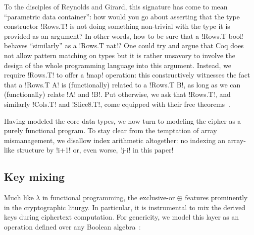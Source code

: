 \documentclass[draft,english]{jflart}
\begin{document}
To the disciples of Reynolds and Girard, this signature has come to
mean ``parametric data container'': how would you go about asserting
that the type constructor \coqe!Rows.T! is not doing something
non-trivial with the type it is provided as an argument? In other
words, how to be sure that a \coqe!Rows.T bool! behaves ``similarly''
as a \coqe!Rows.T nat!? One could try and argue that Coq does not
allow pattern matching on types but it is rather unsavory to involve
the design of the whole programming language into this argument.
%
Instead, we require \coqe!Rows.T! to offer a \coqe!map! operation: this
constructively witnesses the fact that a \coqe!Rows.T A! is
(functionally) related to a \coqe!Rows.T B!, as long as we can
(functionally) relate \coqe!A! and \coqe!B!. Put otherwise, we ask
that \coqe!Rows.T!, and similarly \coqe!Cols.T! and \coqe!Slice8.T!,
come equipped with their free theorems~\citep{reynolds:parametricity,
  wadler:free-theorem}.


Having modeled the core data types, we now turn to modeling the cipher
as a purely functional program. To stay clear from the temptation of
array mismanagement, we disallow index arithmetic altogether: no
indexing an array-like structure by \coqe!i+1! or, even worse,
\coqe!j-i! in this paper!

\subsection{Key mixing}


Much like $\lambda$ in functional programming, the exclusive-or
$\oplus$ features prominently in the cryptographic liturgy. In
particular, it is instrumental to mix the derived keys during
ciphertext computation. For genericity, we model this layer as an
operation defined over any Boolean
algebra~\citep{givant:boolean-algebras}:
%

\end{document}
